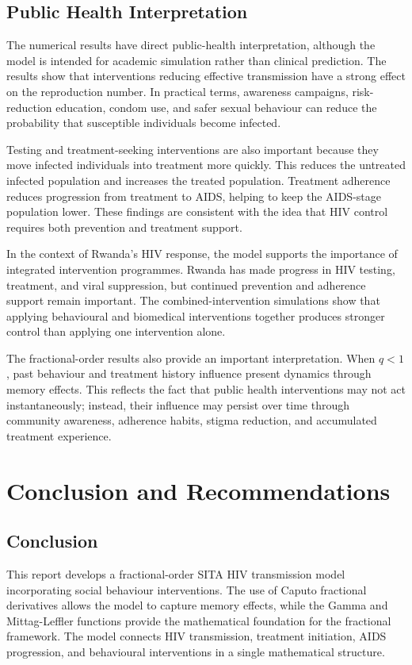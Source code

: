 \documentclass[12pt,a4paper,oneside]{report}
\begin{document}
\section{Public Health Interpretation}
The numerical results have direct public-health interpretation, although the model is intended for academic simulation rather than clinical prediction. The results show that interventions reducing effective transmission have a strong effect on the reproduction number. In practical terms, awareness campaigns, risk-reduction education, condom use, and safer sexual behaviour can reduce the probability that susceptible individuals become infected.

Testing and treatment-seeking interventions are also important because they move infected individuals into treatment more quickly. This reduces the untreated infected population and increases the treated population. Treatment adherence reduces progression from treatment to AIDS, helping to keep the AIDS-stage population lower. These findings are consistent with the idea that HIV control requires both prevention and treatment support.

In the context of Rwanda's HIV response, the model supports the importance of integrated intervention programmes. Rwanda has made progress in HIV testing, treatment, and viral suppression, but continued prevention and adherence support remain important. The combined-intervention simulations show that applying behavioural and biomedical interventions together produces stronger control than applying one intervention alone.

The fractional-order results also provide an important interpretation. When $q<1$, past behaviour and treatment history influence present dynamics through memory effects. This reflects the fact that public health interventions may not act instantaneously; instead, their influence may persist over time through community awareness, adherence habits, stigma reduction, and accumulated treatment experience.

\chapter{Conclusion and Recommendations}

\section{Conclusion}
This report develops a fractional-order SITA HIV transmission model incorporating social behaviour interventions. The use of Caputo fractional derivatives allows the model to capture memory effects, while the Gamma and Mittag-Leffler functions provide the mathematical foundation for the fractional framework. The model connects HIV transmission, treatment initiation, AIDS progression, and behavioural interventions in a single mathematical structure.
\end{document}
